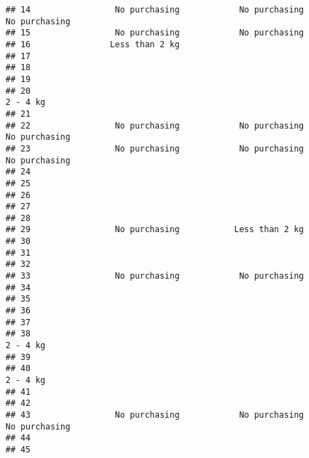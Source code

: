 \documentclass[
]{article}
\begin{document}
\begin{verbatim}
## 14                 No purchasing            No purchasing         No purchasing
## 15                 No purchasing            No purchasing                      
## 16                Less than 2 kg                                               
## 17                                                                             
## 18                                                                             
## 19                                                                             
## 20                                                                     2 - 4 kg
## 21                                                                             
## 22                 No purchasing            No purchasing         No purchasing
## 23                 No purchasing            No purchasing         No purchasing
## 24                                                                             
## 25                                                                             
## 26                                                                             
## 27                                                                             
## 28                                                                             
## 29                 No purchasing           Less than 2 kg                      
## 30                                                                             
## 31                                                                             
## 32                                                                             
## 33                 No purchasing            No purchasing                      
## 34                                                                             
## 35                                                                             
## 36                                                                             
## 37                                                                             
## 38                                                                     2 - 4 kg
## 39                                                                             
## 40                                                                     2 - 4 kg
## 41                                                                             
## 42                                                                             
## 43                 No purchasing            No purchasing         No purchasing
## 44                                                                             
## 45                                                                             

\end{verbatim}
\end{document}
